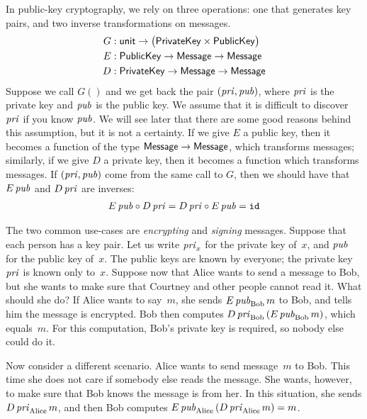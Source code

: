 In public-key cryptography, we rely on three operations: one that generates key pairs, and two inverse transformations on messages.
\begin{align*}
  G &: {\sf unit} \to \bigl( {\sf PrivateKey} \times {\sf PublicKey}\bigr) \\
  E &: {\sf PublicKey} \to {\sf Message} \to {\sf Message} \\
  D &: {\sf PrivateKey} \to {\sf Message} \to {\sf Message}
\end{align*}
Suppose we call $G()$ and we get back the pair $({\it pri},{\it pub})$, where $\it pri$ is the private key and ${\it pub}$ is the public key.
We assume that it is difficult to discover ${\it pri}$ if you know ${\it pub}$.
We will see later that there are some good reasons behind this assumption, but it is not a certainty.
If we give $E$ a public key, then it becomes a function of the type ${\sf Message} \to {\sf Message}$, which transforms messages;
similarly, if we give $D$ a private key, then it becomes a function which transforms messages.
If $({\it pri}, {\it pub})$ come from the same call to $G$, then we should have that $E\,{\it pub}$ and $D\,{\it pri}$ are inverses:
\begin{align*}
  E\,{\it pub} \circ D\,{\it pri}
  = D\,{\it pri} \circ E\,{\it pub}
  = {\tt id}
\end{align*}

The two common use-cases are \emph{encrypting} and \emph{signing} messages.
Suppose that each person has a key pair.
Let us write ${\it pri}_x$ for the private key of~$x$, and ${\it pub}$ for the public key of~$x$.
The public keys are known by everyone; the private key ${\it pri}$ is known only to~$x$.
Suppose now that Alice wants to send a message to Bob, but she wants to make sure that Courtney and other people cannot read it.
What should she do?
If Alice wants to say~$m$, she sends $E\,{\it pub}_{\rm Bob}\,m$ to Bob, and tells him the message is encrypted.
Bob then computes $D\,{\it pri}_{\rm Bob}\,(E\,{\it pub}_{\rm Bob}\,m)$, which equals~$m$.
For this computation, Bob's private key is required, so nobody else could do it.

Now consider a different scenario.
Alice wants to send message~$m$ to Bob.
This time she does not care if somebody else reads the message.
She wants, however, to make sure that Bob knows the message is from her.
In this situation, she sends $D\,{\it pri}_{\rm Alice}\,m$, and then Bob computes $E\,{\it pub}_{\rm Alice}\,(D\,{\it pri}_{\rm Alice}\,m)=m$.

